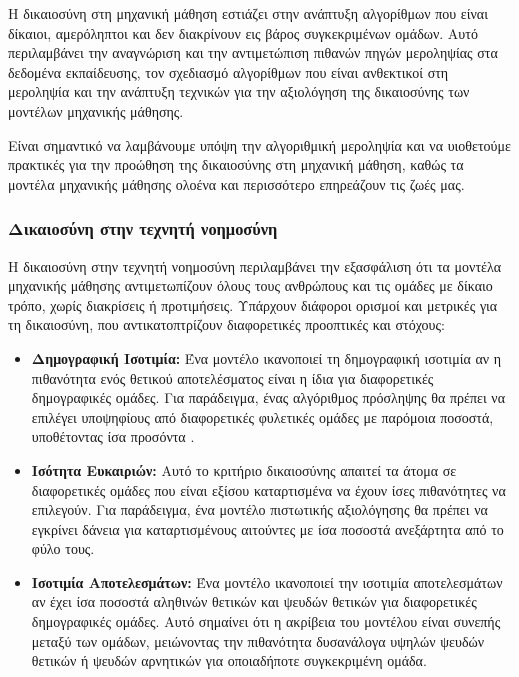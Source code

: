\documentclass[12pt,twoside]{article}
\newcommand{\gr}{\selectlanguage{greek}}
\begin{document}
Η δικαιοσύνη στη μηχανική μάθηση εστιάζει στην ανάπτυξη αλγορίθμων που είναι δίκαιοι, αμερόληπτοι και δεν διακρίνουν εις βάρος συγκεκριμένων ομάδων. Αυτό περιλαμβάνει την αναγνώριση και την αντιμετώπιση πιθανών πηγών μεροληψίας στα δεδομένα εκπαίδευσης, τον σχεδιασμό αλγορίθμων που είναι ανθεκτικοί στη μεροληψία και την ανάπτυξη τεχνικών για την αξιολόγηση της δικαιοσύνης των μοντέλων μηχανικής μάθησης.

Είναι σημαντικό να λαμβάνουμε υπόψη την αλγοριθμική μεροληψία και να υιοθετούμε πρακτικές για την προώθηση της δικαιοσύνης στη μηχανική μάθηση, καθώς τα μοντέλα μηχανικής μάθησης ολοένα και περισσότερο επηρεάζουν τις ζωές μας.

\subsubsection{\gr Δικαιοσύνη στην τεχνητή νοημοσύνη}
\gr Η δικαιοσύνη στην τεχνητή νοημοσύνη περιλαμβάνει την εξασφάλιση ότι τα μοντέλα μηχανικής μάθησης αντιμετωπίζουν όλους τους ανθρώπους και τις ομάδες με δίκαιο τρόπο, χωρίς διακρίσεις ή προτιμήσεις. Υπάρχουν διάφοροι ορισμοί και μετρικές για τη δικαιοσύνη, που αντικατοπτρίζουν διαφορετικές προοπτικές και στόχους:

\begin{itemize}
    \item \textbf{\gr Δημογραφική Ισοτιμία:} \gr Ένα μοντέλο ικανοποιεί τη δημογραφική ισοτιμία αν η πιθανότητα ενός θετικού αποτελέσματος είναι η ίδια για διαφορετικές δημογραφικές ομάδες. Για παράδειγμα, ένας αλγόριθμος πρόσληψης θα πρέπει να επιλέγει υποψηφίους από διαφορετικές φυλετικές ομάδες με παρόμοια ποσοστά, υποθέτοντας ίσα προσόντα \citep{hardt2016equality}.
    \item \textbf{\gr Ισότητα Ευκαιριών:} \gr Αυτό το κριτήριο δικαιοσύνης απαιτεί τα άτομα σε διαφορετικές ομάδες που είναι εξίσου καταρτισμένα να έχουν ίσες πιθανότητες να επιλεγούν. Για παράδειγμα, ένα μοντέλο πιστωτικής αξιολόγησης θα πρέπει να εγκρίνει δάνεια για καταρτισμένους αιτούντες με ίσα ποσοστά ανεξάρτητα από το φύλο τους.
    \item \textbf{\gr Ισοτιμία Αποτελεσμάτων:} \gr Ένα μοντέλο ικανοποιεί την ισοτιμία αποτελεσμάτων αν έχει ίσα ποσοστά αληθινών θετικών και ψευδών θετικών για διαφορετικές δημογραφικές ομάδες. Αυτό σημαίνει ότι η ακρίβεια του μοντέλου είναι συνεπής μεταξύ των ομάδων, μειώνοντας την πιθανότητα δυσανάλογα υψηλών ψευδών θετικών ή ψευδών αρνητικών για οποιαδήποτε συγκεκριμένη ομάδα.
\end{itemize}
\end{document}
